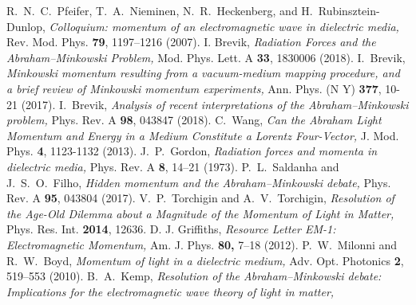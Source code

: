 \documentclass[twocolumn,amssymb,eqsecnum,aps,pra]{revtex4-2}
\begin{document}
\begin{thebibliography}{1}
\newcommand{\enquote}[1]{``#1''}
\par
R.~N.~C.~Pfeifer, T.~A.~Nieminen, N.~R.~Heckenberg, and H.~Rubinsztein-Dunlop,
\textit{Colloquium: momentum of an electromagnetic wave in dielectric media,}
Rev. Mod. Phys.
\textbf{79}, 1197--1216 (2007).
I. Brevik,
\textit{Radiation {F}orces and the {A}braham--{M}inkowski {P}roblem,}
Mod. Phys. Lett. A
\textbf{33}, 1830006 (2018).
I.~Brevik,
\textit{Minkowski momentum resulting from a vacuum-medium mapping 
procedure, and a brief review of Minkowski momentum experiments,}
Ann. Phys. (N Y)
\textbf{377}, 10-21 (2017).
I.~Brevik,
\textit{Analysis of recent interpretations of the
{A}braham--{M}inkowski problem,}
Phys. Rev. A
\textbf{98}, 043847 (2018).
C.~Wang,
\textit{Can the {A}braham {L}ight {M}omentum and {E}nergy in a {M}edium {C}onstitute a {L}orentz {F}our-{V}ector,}
J. Mod. Phys.
\textbf{4}, 1123-1132 (2013).
J.~P.~Gordon, 
\textit{Radiation forces and momenta in dielectric media,}
Phys. Rev. A 
\textbf{8}, 14--21 (1973).
P.~L.~Saldanha and J.~S.~O.~Filho,
\textit{Hidden momentum and the Abraham--Minkowski debate,}
Phys. Rev. A
\textbf{95}, 043804 (2017).
V.~P.~Torchigin and A.~V.~Torchigin,
\textit{Resolution of the {A}ge-{O}ld {D}ilemma about a {M}agnitude of the {M}omentum of {L}ight in {M}atter,}
Phys. Res. Int.
\textbf{2014}, 12636.
D. J. Griffiths,
\textit{Resource {L}etter {E}{M}-1: {E}lectromagnetic {M}omentum,}
Am. J. Phys. 
\textbf{80,} 7--18 (2012).
P.~W.~Milonni and R.~W.~Boyd,
\textit{Momentum of light in a dielectric medium,}
Adv. Opt. Photonics
\textbf{2}, 519--553 (2010).
B.~A.~Kemp, 
\textit{Resolution of the {A}braham--{M}inkowski debate: {I}mplications for the electromagnetic wave theory of light in matter,}

\end{thebibliography}
\end{document}
